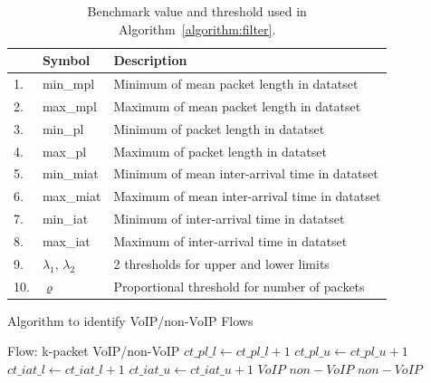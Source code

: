 \documentclass[conference]{IEEEtran}
\begin{document}
\begin{table}[htbp]
  \caption{Benchmark value and threshold used in Algorithm~\ref{algorithm:filter}.}
  \label{tab:rules}
  \centering
  \begin{tabular}{l l l}
    \hline
    \textbf{} & \textbf{Symbol} & \textbf{Description}\\
    \hline
    1. & min\_mpl      &   Minimum of mean packet length in datatset\\
    2. & max\_mpl      &  Maximum of mean packet length in datatset\\
    3. & min\_pl      &   Minimum of packet length in datatset\\
    4. & max\_pl      &   Maximum of packet length in datatset\\
    5. & min\_miat      &   Minimum of mean inter-arrival time in datatset\\
    6. & max\_miat      &   Maximum of mean inter-arrival time in datatset\\
    7. & min\_iat      &   Minimum of inter-arrival time in datatset\\
    8. & max\_iat      &  Maximum of inter-arrival time in datatset\\
    9. & ${\lambda_1}$, ${\lambda_2}$      &  2 thresholds for upper and lower limits \\
    10. & ${\varrho}$    &   Proportional threshold for number of packets\\
    \hline
  \end{tabular}
\end{table}

\renewcommand{\algorithmicrequire}{\textbf{Input:}}
\renewcommand{\algorithmicensure}{\textbf{Output:}}

\begin{algorithm}[!h]
\caption{Algorithm to identify VoIP/non-VoIP Flows}
\label{algorithm:filter}
\begin{algorithmic}[1]
\REQUIRE Flow: k-packet
\ENSURE VoIP/non-VoIP
       	\STATE $ct\_pl\_l \gets ct\_pl\_l +1$
       \ENDIF
       	\STATE $ct\_pl\_u \gets ct\_pl\_u+1$
       \ENDIF
       	\STATE $ct\_iat\_l  \gets ct\_iat\_l+1$
       \ENDIF
       	\STATE $ct\_iat\_u \gets ct\_iat\_u+1$
       \ENDIF
    \ENDFOR
        \RETURN $VoIP$
    \ELSE  \RETURN $non-VoIP$
   \ENDIF
\ELSE \RETURN $non-VoIP$
\ENDIF
\end{algorithmic}
\end{algorithm}
\end{document}
